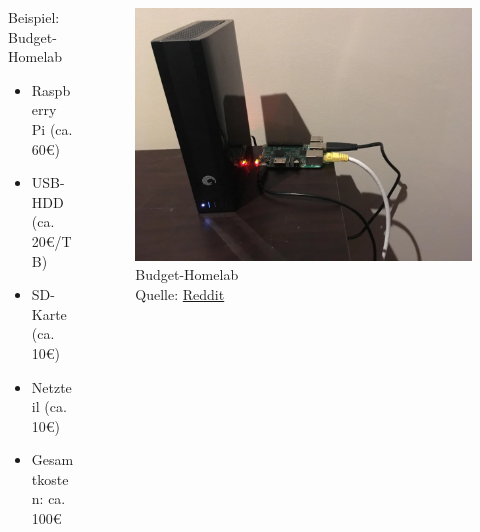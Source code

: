 \documentclass[
    ngerman,
    accentcolor=3b,
    fontsize= 12pt,
    a4paper,
    aspectratio=169,
    colorback=true,
    fancy_row_colors,
    leqno,
    fleqn,
    boxarc=3pt,
    fleqn,
    main,
    design=2008,
]{algoslides}
\begin{document}
    \begin{frame}
        \slidehead{}
        \begin{columns}[T]
            \begin{column}{.5\textwidth}
                Beispiel: Budget-Homelab
                \begin{itemize}
                    \item Raspberry Pi (ca. 60€)
                    \item USB-HDD (ca. 20€/TB)
                    \item SD-Karte (ca. 10€)
                    \item Netzteil (ca. 10€)
                    \item Gesamtkosten: ca. 100€
                \end{itemize}
            \end{column}%
            \begin{column}{.5\textwidth}
                \begin{figure}[ht!]
                    \centering
                    \includegraphics[height=.5\textheight]{budget-setup.png}
                    \caption{Budget-Homelab\\Quelle: \href{https://www.reddit.com/r/raspberry_pi/comments/9ck1aq/extremely_proud_of_my_first_project_a_basic_nas/}{Reddit}}
                    \label{fig:budget-homelab}
                \end{figure}
            \end{column}%
        \end{columns}
    \end{frame}
\end{document}
